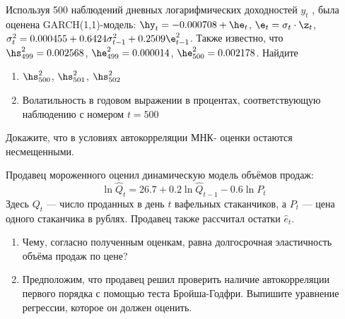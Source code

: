 \documentclass[pdftex,11pt,openany]{book}\usepackage[]{graphicx}\usepackage[]{color}
\begin{document}
\begin{solution}
\end{solution}


\begin{problem}
Используя 500 наблюдений дневных логарифмических доходностей $y_t$ ,
была оценена GARCH(1,1)-модель: $\hy_t=-0.000708+\he_t$, $\e_t=\sigma_t \cdot \z_t$, $\sigma^2_t=0.000455+0.6424\sigma^2_{t-1}+0.2509\e^2_{t-1}$. Также известно, что $\hs^2_{499}=0.002568$, $\he^2_{499}=0.000014$, $\he^2_{500}=0.002178$.
Найдите 
\begin{enumerate}
\item  $\hs^2_{500}$, $\hs^2_{501}$, $\hs^2_{502}$
\item Волатильность в годовом выражении в процентах, соответствующую
наблюдению с номером $t = 500$
\end{enumerate}
\end{problem}

\begin{solution}
\end{solution}


\begin{problem}
Докажите, что в условиях автокорреляции МНК-
оценки остаются несмещенными.
\end{problem}

\begin{solution}
\end{solution}


\begin{problem}
Продавец мороженного оценил динамическую модель объёмов продаж:
\[
\ln \hat{Q}_t=26.7 + 0.2\ln \hat{Q}_{t-1}-0.6\ln P_t
\]
Здесь $Q_t$ --- число проданных в день $t$ вафельных стаканчиков, а $P_t$ --- цена одного стаканчика в рублях. Продавец также рассчитал остатки $\hat{e}_t$.
\begin{enumerate}
\item Чему, согласно полученным оценкам, равна долгосрочная эластичность объёма продаж по цене?
\item Предположим, что продавец решил проверить наличие автокорреляции первого порядка с помощью теста Бройша-Годфри. Выпишите уравнение регрессии, которое он должен оценить.  
\end{enumerate}
\end{problem}

\begin{solution}
\end{solution}
\end{document}
